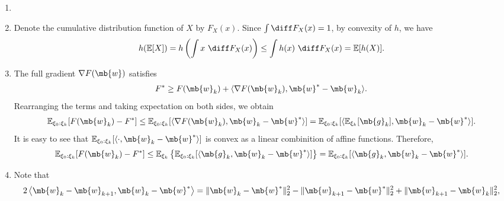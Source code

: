\begin{exercise}
\begin{enumerate}
            \begin{solution}
                \begin{enumerate}
                    \item []
                    \item Denote the cumulative distribution function of $X$ by $F_X(x)$. Since $\int \diff F_X(x) = 1$, by convexity of $h$, we have
                        \begin{align*}
                            h(\mathbb{E}[X]) = h\left(\int x\ \diff F_X(x) \right) \le \int h(x)\ \diff F_X(x) = \mathbb{E}[h(X)].
                        \end{align*}
                    \item The full gradient $\nabla F(\mb{w})$ satisfies
                        \begin{align*}
                            F^* \ge F(\mb{w}_k) + \langle \nabla F(\mb{w}_k), \mb{w}^* - \mb{w}_k \rangle.
                        \end{align*}
                        Rearranging the terms and taking expectation on both sides, we obtain
                        \begin{align*}
                            \mathbb{E}_{\xi_0:\xi_{k}}[F(\mb{w}_{k})-F^*] \le \mathbb{E}_{\xi_0:\xi_{k}}[\langle{\nabla F(\mb{w}_k), \mb{w}_{k}-\mb{w}^*}\rangle] = \mathbb{E}_{\xi_0:\xi_{k}}[\langle{\mathbb{E}_{\xi_k}[\mb{g}_k], \mb{w}_{k}-\mb{w}^*}\rangle].
                        \end{align*}
                        It is easy to see that $\mathbb{E}_{\xi_0:\xi_{k}}[\langle{\cdot, \mb{w}_{k}-\mb{w}^*}\rangle]$ is convex as a linear combinition of affine functions. Therefore,
                        \begin{align*}
                            \mathbb{E}_{\xi_0:\xi_{k}}[F(\mb{w}_{k})-F^*] \le \mathbb{E}_{\xi_k}\left\{\mathbb{E}_{\xi_0:\xi_{k}}[\langle{\mb{g}_k, \mb{w}_{k}-\mb{w}^*}\rangle]\right\} = \mathbb{E}_{\xi_0:\xi_{k}}[\langle{\mb{g}_k, \mb{w}_{k}-\mb{w}^*}\rangle].
                        \end{align*}
                    \item Note that
                        \begin{align*}
                            2 \left\langle \mb{w}_k - \mb{w}_{k+1}, \mb{w}_k - \mb{w}^* \right\rangle = \|\mb{w}_k - \mb{w}^*\|_2^2 - \|\mb{w}_{k+1} - \mb{w}^*\|_2^2 + \|\mb{w}_{k+1} - \mb{w}_k\|_2^2,
                        \end{align*}

\end{enumerate}
\end{solution}
\end{enumerate}
\end{exercise}

